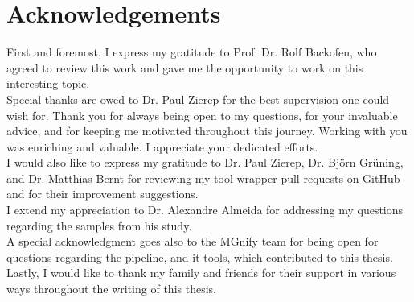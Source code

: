 \chapter*{Acknowledgements}
First and foremost, I express my gratitude to Prof. Dr. Rolf Backofen, who agreed to review this work and gave me the opportunity to work on this interesting topic.\\
Special thanks are owed to Dr. Paul Zierep for the best supervision one could wish for. Thank you for always being open to my questions, for your invaluable advice, and for keeping me motivated throughout this journey. Working with you was enriching and valuable. I appreciate your dedicated efforts.\\
I would also like to express my gratitude to Dr. Paul Zierep, Dr. Björn Grüning, and Dr. Matthias Bernt for reviewing my tool wrapper pull requests on GitHub and for their improvement suggestions.\\
I extend my appreciation to Dr. Alexandre Almeida for addressing my questions regarding the samples from his study.\\
A special acknowledgment goes also to the MGnify team for being open for questions regarding the pipeline, and it tools, which contributed to this thesis.\\
Lastly, I would like to thank my family and friends for their support in various ways throughout the writing of this thesis.
